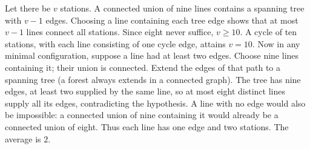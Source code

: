 Let there be $v$ stations. A connected union of nine lines contains a spanning tree with $v-1$ edges. Choosing a line containing each tree edge shows that at most $v-1$ lines connect all stations. Since eight never suffice, $v\ge10$. A cycle of ten stations, with each line consisting of one cycle edge, attains $v=10$. Now in any minimal configuration, suppose a line had at least two edges. Choose nine lines containing it; their union is connected. Extend the edges of that path to a spanning tree (a forest always extends in a connected graph). The tree has nine edges, at least two supplied by the same line, so at most eight distinct lines supply all its edges, contradicting the hypothesis. A line with no edge would also be impossible: a connected union of nine containing it would already be a connected union of eight. Thus each line has one edge and two stations. The average is $\boxed2$.
